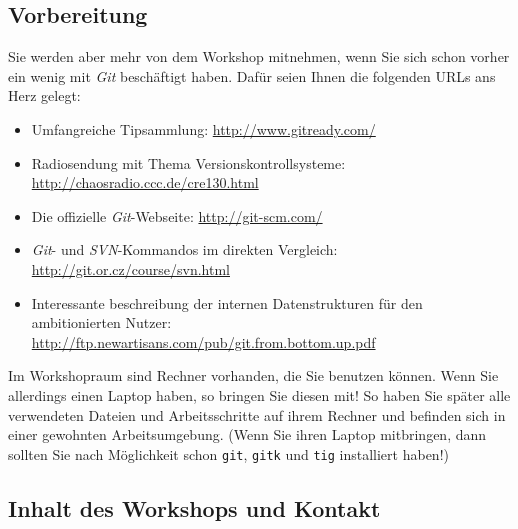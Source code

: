 \documentclass[11pt,            %
               a4paper,         %
               oneside,         %
               DIV14,           %
               fleqn,           %
               smallheadings,   %
               halfparskip,     %
               nochapterprefix, %
               bibtotocnumbered,%
              ]{scrartcl} %
\begin{document}
\subsection*{Vorbereitung}

Sie werden aber mehr von dem Workshop mitnehmen, wenn Sie sich schon
vorher ein wenig mit \emph{Git} beschäftigt haben. Dafür seien Ihnen
die folgenden URLs ans Herz gelegt:

\begin{itemize}
\item Umfangreiche Tipsammlung:
  \url{http://www.gitready.com/}
\item Radiosendung mit Thema Versionskontrollsysteme:\\
  \url{http://chaosradio.ccc.de/cre130.html}
\item Die offizielle \emph{Git}-Webseite:
  \url{http://git-scm.com/}
\item \emph{Git}- und \emph{SVN}-Kommandos im direkten Vergleich:\\
  \url{http://git.or.cz/course/svn.html}
\item Interessante beschreibung der internen Datenstrukturen für den ambitionierten Nutzer:\\
    \url{http://ftp.newartisans.com/pub/git.from.bottom.up.pdf}
\end{itemize}

Im Workshopraum sind Rechner vorhanden, die Sie benutzen können. Wenn
Sie allerdings einen Laptop haben, so bringen Sie diesen mit! So haben
Sie später alle verwendeten Dateien und Arbeitsschritte auf ihrem
Rechner und befinden sich in einer gewohnten Arbeitsumgebung.
(Wenn Sie ihren Laptop mitbringen, dann sollten Sie nach Möglichkeit
schon \texttt{git}, \texttt{gitk} und \texttt{tig} installiert haben!)




\subsection*{Inhalt des Workshops und Kontakt}
\end{document}
